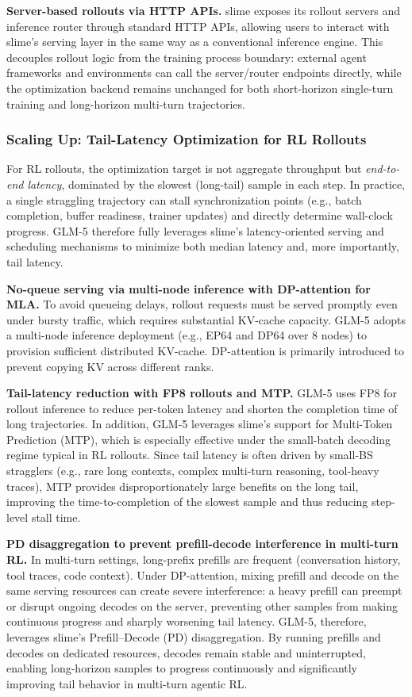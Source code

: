 \textbf{Server-based rollouts via HTTP APIs.} slime exposes its rollout servers and inference router through standard HTTP APIs, allowing users to interact with slime's serving layer in the same way as a conventional inference engine. This decouples rollout logic from the training process boundary: external agent frameworks and environments can call the server/router endpoints directly, while the optimization backend remains unchanged for both short-horizon single-turn training and long-horizon multi-turn trajectories.

\subsubsection{Scaling Up: Tail-Latency Optimization for RL Rollouts}
For RL rollouts, the optimization target is not aggregate throughput but \emph{end-to-end latency}, dominated by the slowest (long-tail) sample in each step. In practice, a single straggling trajectory can stall synchronization points (e.g., batch completion, buffer readiness, trainer updates) and directly determine wall-clock progress. GLM-5 therefore fully leverages slime's latency-oriented serving and scheduling mechanisms to minimize both median latency and, more importantly, tail latency.

\textbf{No-queue serving via multi-node inference with DP-attention for MLA.}
To avoid queueing delays, rollout requests must be served promptly even under bursty traffic, which requires substantial KV-cache capacity. GLM-5 adopts a multi-node inference deployment (e.g., EP64 and DP64 over 8 nodes) to provision sufficient distributed KV-cache. DP-attention is primarily introduced to prevent copying KV across different ranks.

\textbf{Tail-latency reduction with FP8 rollouts and MTP.}
GLM-5 uses FP8 for rollout inference to reduce per-token latency and shorten the completion time of long trajectories. In addition, GLM-5 leverages slime's support for Multi-Token Prediction (MTP), which is especially effective under the small-batch decoding regime typical in RL rollouts. Since tail latency is often driven by small-BS stragglers (e.g., rare long contexts, complex multi-turn reasoning, tool-heavy traces), MTP provides disproportionately large benefits on the long tail, improving the time-to-completion of the slowest sample and thus reducing step-level stall time.

\textbf{PD disaggregation to prevent prefill-decode interference in multi-turn RL.}
In multi-turn settings, long-prefix prefills are frequent (conversation history, tool traces, code context). Under DP-attention, mixing prefill and decode on the same serving resources can create severe interference: a heavy prefill can preempt or disrupt ongoing decodes on the server, preventing other samples from making continuous progress and sharply worsening tail latency. GLM-5, therefore, leverages slime's Prefill--Decode (PD) disaggregation. By running prefills and decodes on dedicated resources, decodes remain stable and uninterrupted, enabling long-horizon samples to progress continuously and significantly improving tail behavior in multi-turn agentic RL.

